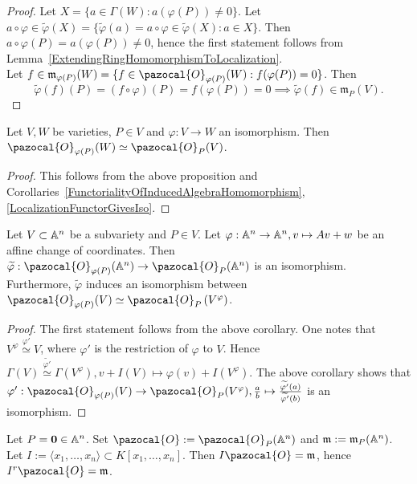 \begin{proof}
    Let $X=\{a\in \Gamma(W): a(\varphi(P))\neq 0\}$. Let $a\circ \varphi \in \widetilde{\varphi}(X)=\{\widetilde{\varphi}(a)=a\circ\varphi\in \widetilde{\varphi}(X) : a\in X\}$. Then $a\circ \varphi(P) = a(\varphi(P)) \neq0 $, hence the first statement follows from  Lemma~\ref{ExtendingRingHomomorphismToLocalization}.\\ 
    Let $f\in \mathfrak{m}_{\varphi(P)}(W)=\{f\in \pazocal{O}_{\varphi(P)}(W) : f(\varphi(P))=0\}$. Then
    $$\widetilde{\varphi}(f)(P)= (f\circ\varphi)(P)=f(\varphi(P))=0\implies \widetilde{\varphi}(f)\in \mathfrak{m}_P(V).$$
\end{proof}
\begin{corollary}\label{IsomorphicVarietiesMapToIsomorphicLocalRings}
    Let $V,W$ be varieties, $P\in V$ and $\varphi: V\rightarrow W$ an isomorphism. Then $\pazocal{O}_{\varphi(P)}(W)\simeq \pazocal{O}_P(V)$.
\end{corollary}
\begin{proof}
    This follows from the above proposition and Corollaries~\ref{FunctorialityOfInducedAlgebraHomomorphism}, \ref{LocalizationFunctorGivesIso}.
\end{proof}
\begin{corollary}\label{LocalRingsTransformedUnderAffineChangeOfCoordinates}
    Let $V\subset \mathbb{A}^n$ be a subvariety and $P\in V$. Let $\varphi: \mathbb{A}^n \rightarrow \mathbb{A}^n,v\mapsto Av+w$ be an affine change of coordinates. Then $\widetilde{\varphi}:\pazocal{O}_{\varphi(P)}(\A^n)\rightarrow \pazocal{O}_P(\A^n)$ is an isomorphism. Furthermore, $\widetilde{\varphi}$ induces an isomorphism between $\pazocal{O}_{\varphi(P)}(V)\simeq \pazocal{O}_P\left(V^\varphi\right)$.
\end{corollary}
\begin{proof}
    The first statement follows from the above corollary. One notes that $V^\varphi \overset{\varphi'}{\simeq} V$, where $\varphi'$ is the restriction of $\varphi$ to $V$. Hence $\Gamma(V)\overset{\widetilde{\varphi'}}{\simeq}\Gamma\left(V^\varphi \right), v+I(V)\mapsto \varphi(v)+I(V^\varphi)$. The above corollary shows that $\varphi' : \pazocal{O}_{\varphi(P)}(V)\rightarrow \pazocal{O}_P(V^\varphi), \frac{a}{b}\mapsto \frac{\widetilde{\varphi'}(a)}{\widetilde{\varphi'}(b)}$ is an isomorphism. 
\end{proof}
\begin{proposition}\label{MaximalIdealOfLocalOfAffineSpaceAtOrigin}
    Let $P=\mathbf{0}\in \mathbb{A}^n$. Set $\pazocal{O}:=\pazocal{O}_P(\A^n)$ and $\mathfrak{m} := \mathfrak{m}_P(\mathbb{A}^n)$. Let $I:=\langle x_1,\dots,x_n\rangle \subset K[x_1,\dots,x_n]$. Then $I\pazocal{O} = \mathfrak{m}$, hence $I^r\pazocal{O}=\mathfrak{m}$. 
\end{proposition}
